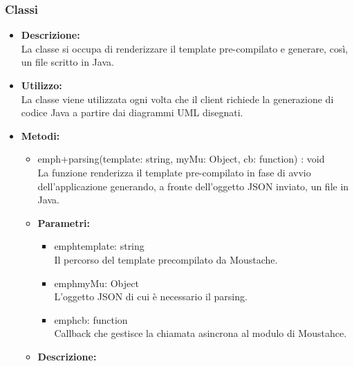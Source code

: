     \subsubsection{Classi}
        \begin{itemize}
          \item \textbf{Descrizione:}\\
          La classe si occupa di renderizzare il template pre-compilato e generare, così, un file scritto in Java.
          \item \textbf{Utilizzo:}\\
          La classe viene utilizzata ogni volta che il client richiede la generazione di codice Java a partire dai diagrammi UML disegnati.
          \item \textbf{Metodi:}\\
          \begin{itemize}
            \item emph{+parsing(template: string, myMu: Object, cb: function) : void}\\
            La funzione renderizza il template pre-compilato in fase di avvio dell'applicazione generando, a fronte dell'oggetto JSON inviato, un file in Java.
            \item \textbf{Parametri: }\\
            \begin{itemize}
            \begin{itemize}
              \item emph{template: string}\\
              Il percorso del template precompilato da Moustache.
              \item emph{myMu: Object}\\
              L'oggetto JSON di cui è necessario il parsing.
              \item emph{cb: function}\\
              Callback che gestisce la chiamata asincrona al modulo di Moustahce.
            \end{itemize}
          \end{itemize}
        \end{itemize}
        \begin{itemize}
          \item \textbf{Descrizione: }\\

\end{itemize}
\end{itemize}
